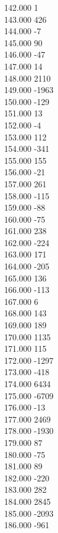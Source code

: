 { 142.000	1 \\
 143.000	426 \\
 144.000	-7 \\
 145.000	90 \\
 146.000	-47 \\
 147.000	14 \\
 148.000	2110 \\
 149.000	-1963 \\
 150.000	-129 \\
 151.000	13 \\
 152.000	-4 \\
 153.000	112 \\
 154.000	-341 \\
 155.000	155 \\
 156.000	-21 \\
 157.000	261 \\
 158.000	-115 \\
 159.000	-88 \\
 160.000	-75 \\
 161.000	238 \\
 162.000	-224 \\
 163.000	171 \\
 164.000	-205 \\
 165.000	136 \\
 166.000	-113 \\
 167.000	6 \\
 168.000	143 \\
 169.000	189 \\
 170.000	1135 \\
 171.000	115 \\
 172.000	-1297 \\
 173.000	-418 \\
 174.000	6434 \\
 175.000	-6709 \\
 176.000	-13 \\
 177.000	2469 \\
 178.000	-1930 \\
 179.000	87 \\
 180.000	-75 \\
 181.000	89 \\
 182.000	-220 \\
 183.000	282 \\
 184.000	2845 \\
 185.000	-2093 \\
 186.000	-961 \\
}
